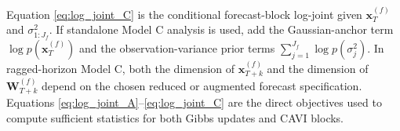 Equation \eqref{eq:log_joint_C} is the conditional forecast-block log-joint given
$\bm x_T^{(f)}$ and $\sigma_{1:J_f}^2$.
If standalone Model C analysis is used, add the Gaussian-anchor term $\log p(\bm x_T^{(f)})$
and the observation-variance prior terms $\sum_{j=1}^{J_f}\log p(\sigma_j^2)$.
In ragged-horizon Model C, both the dimension of $\bm x_{T+k}^{(f)}$ and the dimension of
$\bm W_{T+k}^{(f)}$ depend on the chosen reduced or augmented forecast specification.
Equations \eqref{eq:log_joint_A}--\eqref{eq:log_joint_C} are the direct objectives used to
compute sufficient statistics for both Gibbs updates and CAVI blocks.
